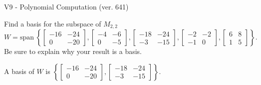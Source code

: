 \begin{exercise}
  \begin{exerciseTitle}V9 - Polynomial Computation (ver. 641)\end{exerciseTitle}
  \begin{exerciseStatement}
    Find a basis for the subspace of \(M_{2,2}\) 
\[W=\mathrm{span}\ \left\{\left[\begin{array}{cc}
-16 & -24 \\
0 & -20
\end{array}\right] , \left[\begin{array}{cc}
-4 & -6 \\
0 & -5
\end{array}\right] , \left[\begin{array}{cc}
-18 & -24 \\
-3 & -15
\end{array}\right] , \left[\begin{array}{cc}
-2 & -2 \\
-1 & 0
\end{array}\right] , \left[\begin{array}{cc}
6 & 8 \\
1 & 5
\end{array}\right]\right\}.\]
 Be sure to explain why your result is a basis.


  \end{exerciseStatement}
  \begin{exerciseAnswer}
   A basis of \(W\) is  \(\left\{\left[\begin{array}{cc}
-16 & -24 \\
0 & -20
\end{array}\right] , \left[\begin{array}{cc}
-18 & -24 \\
-3 & -15
\end{array}\right]\right\}\).
  


  \end{exerciseAnswer}
\end{exercise}